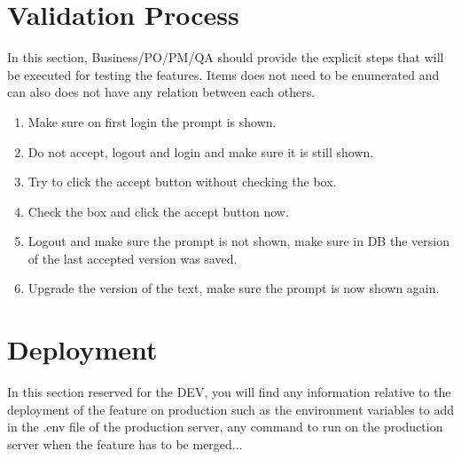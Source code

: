 \documentclass[a4paper,article,oneside]{memoir}
\begin{document}
\noindent{}

      	
        \section{Validation Process}
        In this section, \gls{Business}/\gls{PO}/\gls{PM}/\gls{QA} should provide the explicit steps that will be executed for testing the features. Items does not need to be enumerated and can also does not have any relation between each others.
        
\noindent{}

                \begin{enumerate}
  			\item Make sure on first login the prompt is shown.
  			\item Do not accept, logout and login and make sure it is still shown.
  			\item Try to click the accept button without checking the box.
  			 \item Check the box and click the accept button now.
  			 \item Logout and make sure the prompt is not shown, make sure in DB the version of the last accepted version was saved.
  			 \item Upgrade the version of the text, make sure the prompt is now shown again.
		\end{enumerate}
        \section{Deployment}
        In this section reserved for the \gls{DEV}, you will find any information relative to the deployment of the feature on production such as the environment variables to add in the .env file of the production server, any command to run on the production server when the feature has to be merged... 
\end{document}
